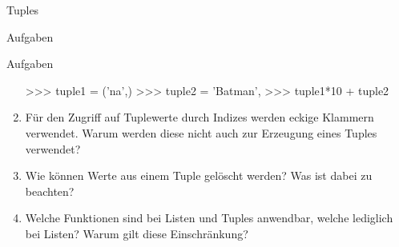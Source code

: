 \begin{subsection}{Tuples}
\begin{subsubsection}{Aufgaben}
\begin{frame}{Aufgaben}
\begin{enumerate}
\begin{pyconcode}
>>> tuple1 = ('na',)
>>> tuple2 = 'Batman',
>>> tuple1*10 + tuple2
\end{pyconcode}                     
                    \item Für den Zugriff auf Tuplewerte durch Indizes werden eckige Klammern verwendet. Warum werden diese nicht auch zur Erzeugung eines Tuples verwendet?
                    
                    \item Wie können Werte aus einem Tuple gelöscht werden? Was ist dabei zu beachten?
                    
                    \item Welche Funktionen sind bei Listen und Tuples anwendbar, welche lediglich bei Listen? Warum gilt diese Einschränkung?
                \end{enumerate}
            \end{frame}
        \end{subsubsection}
    \end{subsection}
    
